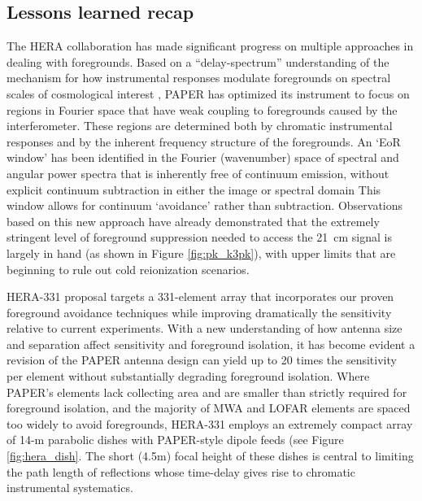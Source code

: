 \documentclass[preprint]{aastex}
\begin{document}
\subsection{Lessons learned recap} %
The HERA collaboration has made significant progress on multiple approaches in dealing with
foregrounds.
Based on a ``delay-spectrum'' understanding of
the mechanism for how instrumental responses modulate foregrounds on
spectral scales of cosmological interest \citep{parsons_et_al2012b},
PAPER has optimized its instrument to focus on regions in Fourier
space that have weak coupling to foregrounds caused by the
interferometer.  These regions are determined both by chromatic
instrumental responses and by the inherent frequency structure of the
foregrounds.  An `EoR window' has been identified in the Fourier
(wavenumber) space of spectral and angular power spectra that is
inherently free of continuum emission, without explicit continuum
subtraction in either the image or spectral domain \citep{pober_et_al2013,morales_et_al2012,Datta_2010}
This window allows for continuum
`avoidance' rather than subtraction. Observations based on this new
approach have already demonstrated that the extremely stringent level
of foreground suppression needed to access the 21~cm signal is largely
in hand (as shown in Figure \ref{fig:pk_k3pk}), with upper limits
that are beginning to rule out cold reionization scenarios.

HERA-331 proposal targets a 331-element array that incorporates
our proven foreground avoidance techniques while improving
dramatically the sensitivity relative to current experiments.  With a
new understanding of how antenna size and separation affect
sensitivity and foreground isolation, it has become evident a revision
of the PAPER antenna design can yield up to 20 times the sensitivity
per element without substantially degrading foreground isolation.
Where PAPER's elements lack collecting area and are smaller than
strictly required for foreground isolation, and the majority of MWA
and LOFAR elements are spaced too widely to avoid foregrounds,
HERA-331 employs an extremely compact array of 14-m parabolic dishes
with PAPER-style dipole feeds (see Figure \ref{fig:hera_dish}.  The
short (4.5m) focal height of these dishes is central to limiting the
path length of reflections whose time-delay gives rise to chromatic
instrumental systematics.
\end{document}
